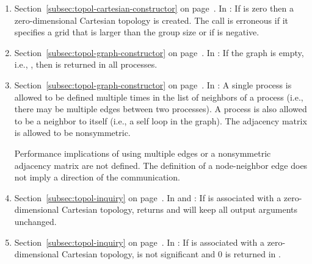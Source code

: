 \begin{enumerate}
\item
Section~\ref{subsec:topol-cartesian-constructor} on page~\pageref{subsec:topol-cartesian-constructor}.
\newline
In :
If  is zero then a zero-dimensional Cartesian topology is created. The
call is erroneous if it specifies a grid that is larger than the group size or if
 is negative.

\item
Section~\ref{subsec:topol-graph-constructor} on page~\pageref{subsec:topol-graph-constructor}.
\newline
In :
If the graph is empty, i.e., , 
then  is returned in all processes. 

\item
Section~\ref{subsec:topol-graph-constructor} on page~\pageref{subsec:topol-graph-constructor}.
\newline
In :
A single process is allowed to be defined multiple times in the list of
neighbors of a process (i.e., there may be multiple edges between two
processes). A process is also allowed to be a neighbor to itself (i.e., a self
loop in the graph). The adjacency matrix is allowed to be nonsymmetric.
\begin{users} 
Performance implications of using multiple edges or a nonsymmetric
adjacency matrix are not defined. The definition of a node-neighbor
edge does not imply a direction of the communication.
\end{users} 

\item
Section~\ref{subsec:topol-inquiry} on page~\pageref{subsec:topol-inquiry}.
\newline
In  and : 
If  is associated with a zero-dimensional Cartesian topology,
 returns  and  will keep
all output arguments unchanged. 

\item
Section~\ref{subsec:topol-inquiry} on page~\pageref{subsec:topol-inquiry}.
\newline
In :
If  is associated with a zero-dimensional Cartesian topology,
 is not significant and 0 is returned in . 


\end{enumerate}
